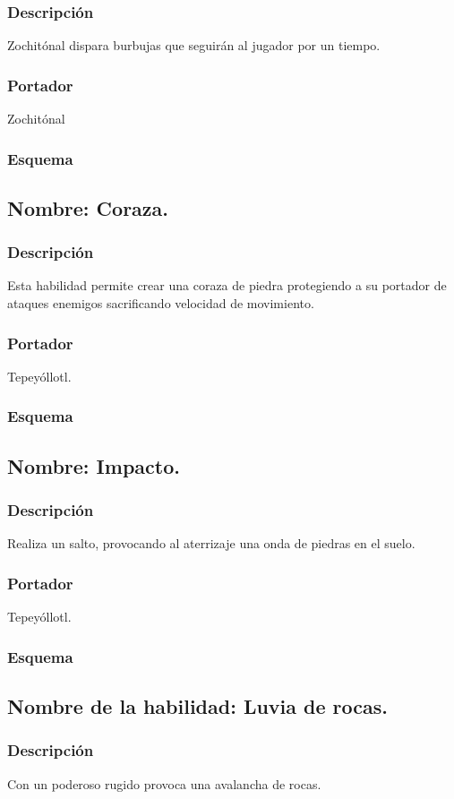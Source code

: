 \documentclass[11pt,letterpaper]{article}
\begin{document}
\subsubsection{Descripción}
Zochitónal dispara burbujas que seguirán al jugador por un tiempo.  
\subsubsection{Portador}
Zochitónal
\subsubsection{Esquema}
\subsection{Nombre: Coraza.}
\subsubsection{Descripción}
Esta habilidad permite crear una coraza de piedra protegiendo a su portador de ataques enemigos sacrificando velocidad de movimiento.  
\subsubsection{Portador}
Tepeyóllotl.
\subsubsection{Esquema}
\subsection{Nombre: Impacto.}
\subsubsection{Descripción}
Realiza un salto, provocando al aterrizaje una onda de piedras en el suelo.
\subsubsection{Portador}
Tepeyóllotl.
\subsubsection{Esquema}
\subsection{Nombre de la habilidad: Luvia de rocas.}
\subsubsection{Descripción}
Con un poderoso rugido provoca una avalancha de rocas. 
\end{document}
